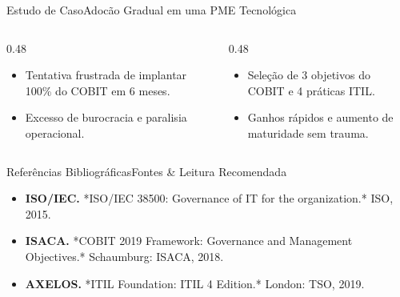 \begin{senaiframe}{Estudo de Caso}{Adocão Gradual em uma PME Tecnológica}
  \begin{columns}[t]
    \begin{column}{0.48\textwidth}
      \begin{tcolorbox}[senairedcard, title={Erro Inicial}]
        \begin{itemize}
          \item Tentativa frustrada de implantar 100\% do COBIT em 6 meses.
          \item Excesso de burocracia e paralisia operacional.
        \end{itemize}
      \end{tcolorbox}
    \end{column}
    \begin{column}{0.48\textwidth}
      \begin{tcolorbox}[senaigreencard, title={Solução Reajustada}]
        \begin{itemize}
          \item Seleção de 3 objetivos do COBIT e 4 práticas ITIL.
          \item Ganhos rápidos e aumento de maturidade sem trauma.
        \end{itemize}
      \end{tcolorbox}
    \end{column}
  \end{columns}
\end{senaiframe}

\begin{senaiframe}{Referências Bibliográficas}{Fontes \& Leitura Recomendada}
  \vspace{0.5cm}
  \begin{tcolorbox}[senaicard, title={Obras de Referência}]
    \begin{itemize}
      \item \textbf{ISO/IEC.} *ISO/IEC 38500: Governance of IT for the organization.* ISO, 2015.
      \item \textbf{ISACA.} *COBIT 2019 Framework: Governance and Management Objectives.* Schaumburg: ISACA, 2018.
      \item \textbf{AXELOS.} *ITIL Foundation: ITIL 4 Edition.* London: TSO, 2019.
    \end{itemize}
  \end{tcolorbox}
\end{senaiframe}

